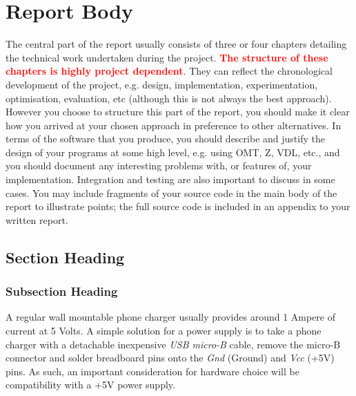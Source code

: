 \chapter{Report Body}
The central part of the report usually consists of three or four chapters detailing the technical work undertaken during the project. {\bf{\textcolor{red}{The structure of these chapters is highly project dependent}}}. They can reflect the chronological development of the project, e.g. design, implementation, experimentation, optimisation, evaluation, etc (although this is not always the best approach). However you choose to structure this part of the report, you should make it clear how you arrived at your chosen approach in preference to other alternatives. In terms of the software that you produce, you should describe and justify the design of your programs at some high level, e.g. using OMT, Z, VDL, etc., and you should document any interesting problems with, or features of, your implementation. Integration and testing are also important to discuss in some cases. You may include fragments of your source code in the main body of the report to illustrate points; the full source code is included in an appendix to your written report.

\section{Section Heading}

\subsection{Subsection Heading}


A regular wall mountable phone charger usually provides around 1 Ampere of current at 5 Volts. A simple solution for a power supply is to take a phone charger with a detachable inexpensive \emph{USB micro-B} cable, remove the micro-B connector and solder breadboard pins onto the \emph{Gnd} (Ground) and \emph{Vcc} (+5V) pins. As such, an important consideration for hardware choice will be compatibility with a +5V power supply.
